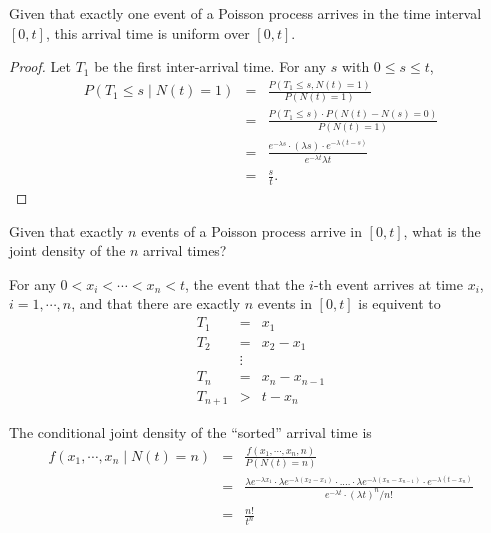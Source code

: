 \begin{properity}
Given that exactly one event of a Poisson process arrives in the time interval $ [0, t] $, this arrival time is uniform over $ [0, t] $.
\begin{proof}
Let $ T_{1} $ be the first inter-arrival time. For any $ s $ with $ 0 \le s \le t $,
\begin{eqnarray*}
P(T_{1} \le s \mid N(t) = 1)
  & = & \frac{P(T_{1} \le s, N(t) = 1)}{P(N(t) = 1)} \\
  & = & \frac{P(T_{1} \le s) \cdot P(N(t) - N(s) = 0)}{P(N(t) = 1)} \\
  & = & \frac{e^{-\lambda s} \cdot (\lambda s) \cdot e^{-\lambda(t - s)}}{e^{-\lambda t} \lambda t} \\
  & = & \frac{s}{t}.
\end{eqnarray*}
\end{proof}
\end{properity}

\begin{corollary}[推廣]
Given that exactly $ n $ events of a Poisson process arrive in $ [0, t] $, what is the joint density of the $ n $ arrival times?

For any $ 0 < x_{i} < \cdots < x_{n} < t $, the event that the $ i $-th event arrives at time $ x_{i} $, $ i = 1, \cdots, n $, and that there are exactly $ n $ events in $ [0, t] $ is equivent to
\begin{eqnarray*}
T_{1} & = & x_{1} \\
T_{2} & = & x_{2} - x_{1} \\
& \vdots & \\
T_{n} & = & x_{n} - x_{n - 1} \\
T_{n + 1} & > & t - x_{n}
\end{eqnarray*}

The conditional joint density of the ``sorted'' arrival time is
\begin{eqnarray*}
f(x_{1}, \cdots, x_{n} \mid N(t) = n)
  & = & \frac{f(x_{1}, \cdots, x_{n}, n)}{P(N(t) = n)} \\
  & = & \frac{\lambda e^{-\lambda x_{1}} \cdot \lambda e^{-\lambda (x_{2} - x_{1})} \cdot .... \cdot \lambda e^{-\lambda (x_{n} - x_{n - 1})} \cdot e^{-\lambda (t - x_{n})}}{e^{-\lambda t} \cdot (\lambda t)^{n} / n!} \\
  & = & \frac{n!}{t^{n}}
\end{eqnarray*}
\end{corollary}

